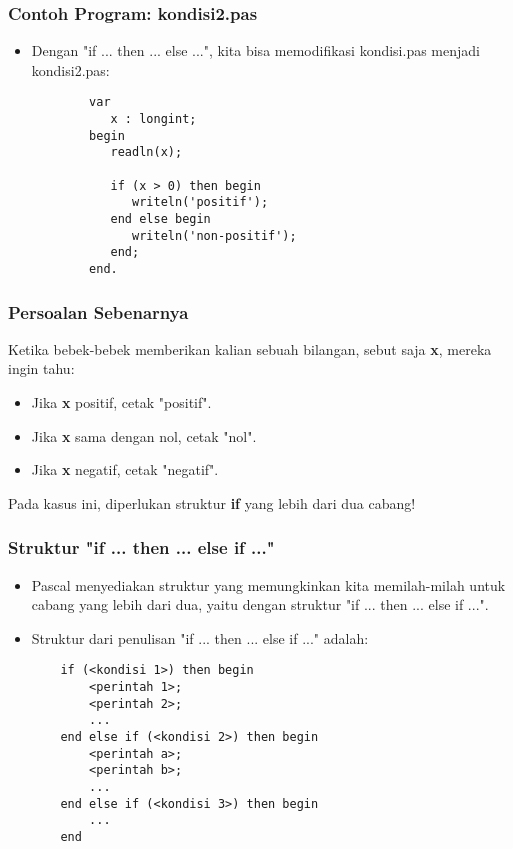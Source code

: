 \documentclass{beamer}
\begin{document}
\begin{frame}[fragile]
\frametitle{Contoh Program: kondisi2.pas}
\begin{itemize}
	\item Dengan "if ... then ... else ...", kita bisa memodifikasi kondisi.pas menjadi kondisi2.pas:
	\begin{lstlisting}
		var
		   x : longint;
		begin
		   readln(x);
		
		   if (x > 0) then begin
		      writeln('positif');
		   end else begin
		      writeln('non-positif');
		   end;
		end.
	\end{lstlisting}
\end{itemize}
\end{frame}

\begin{frame}
\frametitle{Persoalan Sebenarnya}
Ketika bebek-bebek memberikan kalian sebuah bilangan, sebut saja \textbf{x}, mereka ingin tahu:
\begin{itemize}
	\item Jika \textbf{x} positif, cetak "positif".
	\item Jika \textbf{x} sama dengan nol, cetak "nol".
	\item Jika \textbf{x} negatif, cetak "negatif".
\end{itemize}

Pada kasus ini, diperlukan struktur \textbf{if} yang lebih dari dua cabang!
\end{frame}

\begin{frame}[fragile]
\frametitle{Struktur "if ... then ... else if ..."}
\begin{itemize}
	\item Pascal menyediakan struktur yang memungkinkan kita memilah-milah untuk cabang yang lebih dari dua, yaitu dengan struktur "if ... then ... else if ...".
	\item Struktur dari penulisan "if ... then ... else if ..." adalah:
	\begin{lstlisting}
	if (<kondisi 1>) then begin
	    <perintah 1>;
	    <perintah 2>;
	    ...
	end else if (<kondisi 2>) then begin
	    <perintah a>;
	    <perintah b>;
	    ...	
	end else if (<kondisi 3>) then begin
	    ...
	end
	\end{lstlisting}

\end{itemize}
\end{frame}
\end{document}
